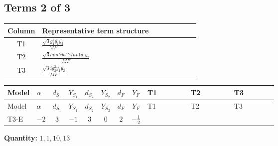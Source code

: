\documentclass[8pt]{article}
\begin{document}
\begin{landscape}
\subsection*{Terms 2 of 3}
\begin{center}
\begin{tabular}{@{}c >{\raggedright\arraybackslash}p{0.82\linewidth}@{}}
\toprule
Column & Representative term structure \\
\midrule
T1 & \(\displaystyle \frac{\sqrt{3} g_{1}^{2} \overline{y_{1}} \overline{y_{2}}}{MF}\) \\
\midrule
T2 & \(\displaystyle \frac{\sqrt{3} lambda12Inv1 \overline{y_{1}} \overline{y_{2}}}{MF}\) \\
\midrule
T3 & \(\displaystyle \frac{\sqrt{3} i g_{2}^{2} \overline{y_{1}} \overline{y_{2}}}{MF}\) \\
\midrule
\bottomrule
\end{tabular}
\end{center}
\smallskip
\tiny
\begin{longtable}{@{}llcccccc >{\raggedright\arraybackslash}p{0.21\linewidth} >{\raggedright\arraybackslash}p{0.21\linewidth} >{\raggedright\arraybackslash}p{0.21\linewidth}@{}}
\toprule
Model & $\alpha$ & $d_{S_1}$ & $Y_{S_1}$ & $d_{S_2}$ & $Y_{S_2}$ & $d_F$ & $Y_F$ & T1 & T2 & T3 \\
\midrule
\endfirsthead
\toprule
Model & $\alpha$ & $d_{S_1}$ & $Y_{S_1}$ & $d_{S_2}$ & $Y_{S_2}$ & $d_F$ & $Y_F$ & T1 & T2 & T3 \\
\midrule
\endhead
T3-E & $-2$ & $3$ & $-1$ & $3$ & $0$ & $2$ & $-\frac{1}{2}$ & \scriptsize\adjustbox{max width=\linewidth}{$\begin{gathered} - \frac{\sqrt{3} g_{1}^{2} \overline{y_{1}} \overline{y_{2}}}{8 MF}\end{gathered}$} & \scriptsize\adjustbox{max width=\linewidth}{$\begin{gathered} \frac{\sqrt{3} lambda12Inv1 \overline{y_{1}} \overline{y_{2}}}{6 MF}\end{gathered}$} & \scriptsize\adjustbox{max width=\linewidth}{$\begin{gathered} \frac{\sqrt{3} i g_{2}^{2} \overline{y_{1}} \overline{y_{2}}}{6 MF}\end{gathered}$} \\
\midrule
\bottomrule
\end{longtable}
\clearpage
\noindent\textbf{Quantity: }$\mathrm{1,1,10,13}$\par\smallskip

\end{landscape}
\end{document}
